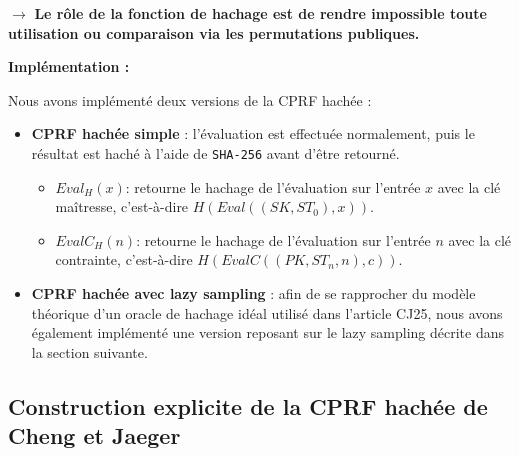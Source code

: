 \documentclass[9pt]{extarticle}
\begin{document}
$\rightarrow$ \textbf{Le rôle de la fonction de hachage est de rendre impossible toute utilisation ou comparaison
via les permutations publiques.}

\begin{center}
\end{center}

\textbf{Implémentation :}

Nous avons implémenté deux versions de la CPRF hachée :

\begin{itemize}
  \item \textbf{CPRF hachée simple} : l’évaluation est effectuée normalement,
  puis le résultat est haché à l’aide de \texttt{SHA-256} avant d’être retourné.
    \begin{itemize}
      \item \texttt{$Eval_H(x)$}: retourne le hachage de l’évaluation sur l’entrée $x$ avec la clé maîtresse, c’est-à-dire $H(Eval((SK, ST_0), x))$.
      \item \texttt{$EvalC_H(n)$}: retourne le hachage de l’évaluation sur l’entrée $n$ avec la clé contrainte, c’est-à-dire $H(EvalC((PK, ST_n, n), c))$.
    \end{itemize}

  \item \textbf{CPRF hachée avec lazy sampling} : afin de se rapprocher du modèle
  théorique d’un oracle de hachage idéal utilisé dans l'article CJ25, nous avons également implémenté
  une version reposant sur le lazy sampling décrite dans la section suivante.
\end{itemize}


\subsection{Construction explicite de la CPRF hachée de Cheng et Jaeger}
\end{document}
